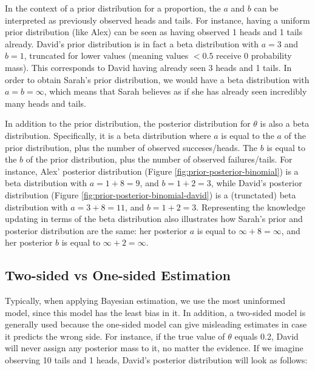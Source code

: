 \documentclass[
]{book}
\begin{document}
In the context of a prior distribution for a proportion, the \(a\) and \(b\) can be interpreted as previously observed heads and tails. For instance, having a uniform prior distribution (like Alex) can be seen as having observed 1 heads and 1 tails already. David's prior distribution is in fact a beta distribution with \(a = 3\) and \(b = 1\), truncated for lower values (meaning values \(< 0.5\) receive 0 probability mass). This corresponds to David having already seen 3 heads and 1 tails. In order to obtain Sarah's prior distribution, we would have a beta distribution with \(a = b = \infty\), which means that Sarah believes as if she has already seen incredibly many heads and tails.

In addition to the prior distribution, the posterior distribution for \(\theta\) is also a beta distribution. Specifically, it is a beta distribution where \(a\) is equal to the \(a\) of the prior distribution, plus the number of observed succeses/heads. The \(b\) is equal to the \(b\) of the prior distribution, plus the number of observed failures/tails. For instance, Alex' posterior distribution (Figure \ref{fig:prior-posterior-binomial}) is a beta distribution with \(a = 1 + 8 = 9\), and \(b = 1 + 2 = 3\), while David's posterior distribution (Figure \ref{fig:prior-posterior-binomial-david}) is a (trunctated) beta distribution with \(a = 3 + 8 = 11\), and \(b = 1 + 2 = 3\). Representing the knowledge updating in terms of the beta distribution also illustrates how Sarah's prior and posterior distribution are the same: her posterior \(a\) is equal to \(\infty + 8 = \infty\), and her posterior \(b\) is equal to \(\infty + 2 = \infty\).

\hypertarget{two-sided-vs-one-sided-estimation}{%
\subsection{Two-sided vs One-sided Estimation}\label{two-sided-vs-one-sided-estimation}}

Typically, when applying Bayesian estimation, we use the most uninformed model, since this model has the least bias in it. In addition, a two-sided model is generally used because the one-sided model can give misleading estimates in case it predicts the wrong side. For instance, if the true value of \(\theta\) equals 0.2, David will never assign any posterior mass to it, no matter the evidence. If we imagine observing 10 tails and 1 heads, David's posterior distribution will look as follows:
\end{document}
